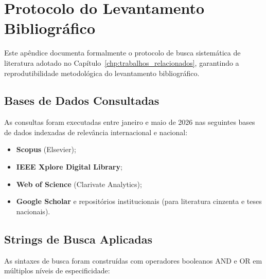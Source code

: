 \documentclass[
	12pt,				
	openright,			
	oneside,			
	a4paper,			
	english,			
	brazil				
	]{abntex2}
\begin{document}
\apendices

\chapter{Protocolo do Levantamento Bibliográfico}
\label{apendice:protocolo_busca}

Este apêndice documenta formalmente o protocolo de busca sistemática de literatura adotado no Capítulo~\ref{chp:trabalhos_relacionados}, garantindo a reprodutibilidade metodológica do levantamento bibliográfico.

\section{Bases de Dados Consultadas}
As consultas foram executadas entre janeiro e maio de 2026 nas seguintes bases de dados indexadas de relevância internacional e nacional:
\begin{itemize}
    \item \textbf{Scopus} (Elsevier);
    \item \textbf{IEEE Xplore Digital Library};
    \item \textbf{Web of Science} (Clarivate Analytics);
    \item \textbf{Google Scholar} e repositórios institucionais (para literatura cinzenta e teses nacionais).
\end{itemize}

\section{Strings de Busca Aplicadas}
As sintaxes de busca foram construídas com operadores booleanos AND e OR em múltiplos níveis de especificidade:
\end{document}
